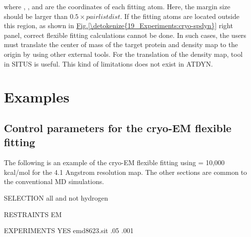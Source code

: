\documentclass[a4paper,11pt,oneside,english]{sphinxmanual}
\begin{document}
where , , and  are the coordinates of each fitting atom. Here, the margin size should be larger than \(0.5 \times pairlistdist\).
If the fitting atoms are located outside this region, as shown in \hyperref[\detokenize{19_Experiments:cryo-spdyn}]{Fig.\@ \ref{\detokenize{19_Experiments:cryo-spdyn}}} right panel, correct flexible fitting calculations cannot be done.
In such cases, the users must translate the center of mass of the target protein and density map to the origin
by using other external tools. For the translation of the density map,  tool in SITUS is useful.
This kind of limitations does not exist in ATDYN.


\section{Examples}
\label{\detokenize{19_Experiments:examples}}

\subsection{Control parameters for the cryo-EM flexible fitting}
\label{\detokenize{19_Experiments:control-parameters-for-the-cryo-em-flexible-fitting}}
The following is an example of the cryo-EM flexible fitting using  = 10,000 kcal/mol
for the 4.1 Angstrom resolution map.
The other sections are common to the conventional MD simulations.

\begin{sphinxVerbatim}[commandchars=\\\{\}]
\PYG{o}{[}SELECTION\PYG{o}{]}
           all and not hydrogen

\PYG{o}{[}RESTRAINTS\PYG{o}{]}
       
        EM              
                   
                   

\PYG{o}{[}EXPERIMENTS\PYG{o}{]}
            YES             
     emd\PYGZus{}8623.sit    
      .05            
  .001           
                    
\end{sphinxVerbatim}
\end{document}
